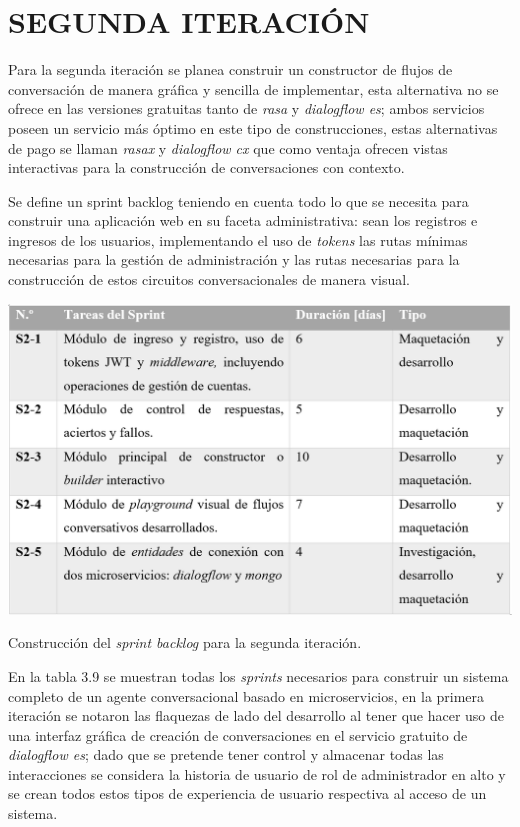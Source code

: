\documentclass[letter, openright, 12pt]{book}
\begin{document}
\section{SEGUNDA ITERACIÓN}
Para la segunda iteración se planea construir un constructor de flujos de conversación de manera gráfica y sencilla de implementar, esta alternativa no se ofrece en las versiones gratuitas tanto de {\it rasa} y {\it dialogflow es}; ambos servicios poseen un servicio más óptimo en este tipo de construcciones, estas alternativas de pago se llaman {\it rasax} y {\it dialogflow cx} que como ventaja ofrecen vistas interactivas para la construcción de conversaciones con contexto.
\par
Se define un sprint backlog teniendo en cuenta todo lo que se necesita para construir una aplicación web en su faceta administrativa: sean los registros e ingresos de los usuarios, implementando el uso de {\it tokens} las rutas mínimas necesarias para la gestión de administración y las rutas necesarias para la construcción de estos circuitos conversacionales de manera visual. 

\begin{table}[H]
\includegraphics[width=1.1\textwidth]{tabla3_9}
\caption{Construcción del {\it sprint backlog} para la segunda iteración. } 
\label{tab:tabla3_9} 
\end{table}

En la tabla 3.9 se muestran todas los {\it sprints} necesarios para construir un sistema completo de un agente conversacional basado en microservicios, en la primera iteración se notaron las flaquezas de lado del desarrollo al tener que hacer uso de una interfaz gráfica de creación de conversaciones en el servicio gratuito de {\it dialogflow es}; dado que se pretende tener control y almacenar todas las interacciones se considera la historia de usuario de rol de administrador en alto y se crean todos estos tipos de experiencia de usuario respectiva al acceso de un sistema. 
\end{document}
